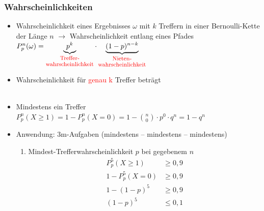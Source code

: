 \subsubsection{Wahrscheinlichkeiten}
\begin{itemize}
    \item Wahrscheinlichkeit eines Ergebnisses $\omega$ mit $k$ Treffern in einer Bernoulli-Kette der Länge $n$ $\longrightarrow$ Wahrscheinlichkeit entlang eines Pfades\\ $P_p^n(\omega) = \underbrace{p^k}_{\shortstack{\textcolor{red}{\footnotesize{Treffer-}}\\ \textcolor{red}{\footnotesize{wahrscheinlichkeit}}}} \cdot
\underbrace{(1 - p)^{n - k}}_{\shortstack{\footnotesize{\textcolor{red}{Nieten-}}\\ \footnotesize{\textcolor{red}{wahrscheinlichkeit}}}}$\\
    \item Wahrscheinlichkeit für \textcolor{red}{genau k} Treffer beträgt\\ \\
    \item Mindestens ein Treffer\\ $P_p^n(X\geq 1) = 1- P_p^n(X=0) = 1- \binom{n}{0}\cdot p^0 \cdot q^n = 1-q^n$\\
    \item Anwendung: 3m-Aufgaben (mindestens -- mindestens -- mindestens)\\
\begin{enumerate}
    \item Mindest-Trefferwahrscheinlichkeit $p$ bei gegebenem $n$
    \begin{equation*}
        \begin{split}
            P^5_p(X\geq 1) &\geq 0{,}9\\
            1-P^5_p(X=0)&\geq 0{,}9\\
            1-(1-p)^5 &\geq 0{,}9\\
            (1-p)^5 &\leq 0{,}1\\

\end{split}
\end{equation*}
\end{enumerate}
\end{itemize}
